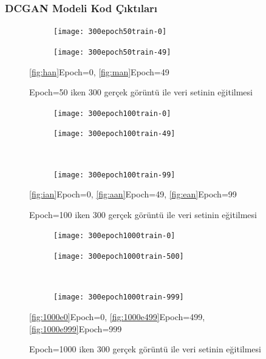 \documentclass[12pt, a4paper]{article}
\begin{document}
	\subsubsection{DCGAN Modeli Kod Çıktıları}
	
	\begin{figure}[htbp]
		\centering
		\begin{subfigure}{0.40\textwidth}
			\centering
			\texttt{[image: 300epoch50train-0]}
			\caption{}
			\label{fig:han}
		\end{subfigure}
		\hfill
		\begin{subfigure}{0.40\textwidth}
			\centering
			\texttt{[image: 300epoch50train-49]}
			\caption{}
			\label{fig:man}
		\end{subfigure}
		\caption{Epoch=50 iken 300 gerçek görüntü ile veri setinin eğitilmesi}
		\eqref{fig:han}Epoch=0,
		\eqref{fig:man}Epoch=49
	\end{figure}
	\FloatBarrier
	\begin{figure}[htbp]
		\centering
		\begin{subfigure}{0.45\textwidth}
			\centering
			\texttt{[image: 300epoch100train-0]}
			\caption{}
			\label{fig:ian}
		\end{subfigure}
		\hfill
		\begin{subfigure}{0.45\textwidth}
			\centering
			\texttt{[image: 300epoch100train-49]}
			\caption{}
			\label{fig:aan}
		\end{subfigure}
		\\
		\begin{subfigure}{0.45\textwidth}
			\centering
			\texttt{[image: 300epoch100train-99]}
			\caption{}
			\label{fig:ean}
		\end{subfigure}
		\caption{Epoch=100 iken 300 gerçek görüntü ile veri setinin eğitilmesi}
		\eqref{fig:ian}Epoch=0,
		\eqref{fig:aan}Epoch=49,
		\eqref{fig:ean}Epoch=99
	\end{figure}
	
	\begin{figure}[htbp]
		\centering
		\begin{subfigure}{0.45\textwidth}
			\centering
			\texttt{[image: 300epoch1000train-0]}
			\caption{}
			\label{fig:1000e0}
		\end{subfigure}
		\hfill
		\begin{subfigure}{0.45\textwidth}
			\centering
			\texttt{[image: 300epoch1000train-500]}
			\caption{}
			\label{fig:1000e499}
		\end{subfigure}
		\\
		\begin{subfigure}{0.45\textwidth}
			\centering
			\texttt{[image: 300epoch1000train-999]}
			\caption{}
			\label{fig:1000e999}
		\end{subfigure}
		\caption{Epoch=1000 iken 300 gerçek görüntü ile veri setinin eğitilmesi}
		\eqref{fig:1000e0}Epoch=0,
		\eqref{fig:1000e499}Epoch=499,
		\eqref{fig:1000e999}Epoch=999
	\end{figure}
	
\end{document}
